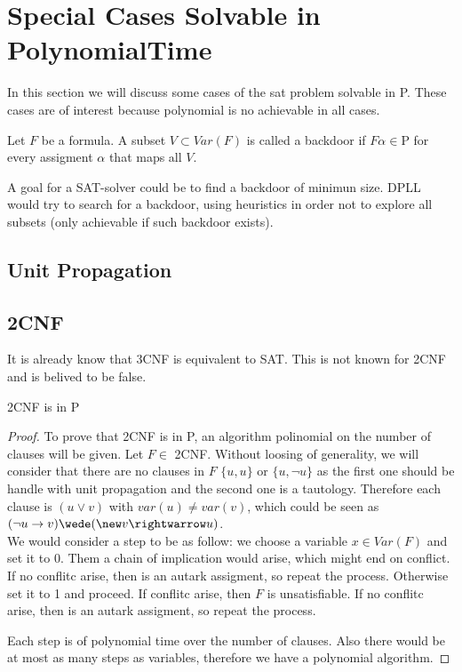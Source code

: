 \newpage

\section{Special Cases Solvable in PolynomialTime}


In this section we will discuss some cases of the sat problem solvable in P. These cases are of interest because polynomial is no achievable in all cases.

\begin{definition}
  Let $F$ be a formula. A subset $ V \subset Var(F)$ is called a backdoor if $F\alpha \in \text{P}$ for every assigment $\alpha$ that maps all $V$.
\end{definition}
A goal for a SAT-solver could be to find a backdoor of minimun size. DPLL would try to search for a backdoor, using heuristics in order not to explore all subsets (only achievable if such backdoor exists).
\subsection{Unit Propagation}


\subsection{2CNF}
It is already know that 3CNF is equivalent to SAT. This is not known for 2CNF and is belived to be false.

\begin{proposition}
  2CNF is in P 
\end{proposition}
\begin{proof}

  To prove that 2CNF is in P, an algorithm polinomial on the number of clauses will be given. Let $F \in$ 2CNF.  Without loosing of generality, we will consider that there are no clauses in $F$ $\{u,u\}$ or $\{u,\neg u\}$ as the first one should be handle with unit propagation and the second one is a tautology. Therefore each clause is $(u \vee v)$ with $var(u) \ne var(v)$, which could be seen as $(\neg u \rightarrow v) \wede (\new v \rightwarrow u)$.\\


  
  We would consider a step to be as follow: we choose a variable $x \in Var(F)$ and set it to 0. Them a chain of implication would arise, which might end on conflict. If no conflitc arise, then is an autark assigment, so repeat the process. Otherwise set it to 1 and proceed. If conflitc arise, then $F$ is unsatisfiable. If no conflitc arise, then is an autark assigment, so repeat the process.
  

  Each step is of polynomial time over the number of clauses. Also there would be at most as many steps as variables, therefore we have a polynomial algorithm.
  
  
\end{proof}

